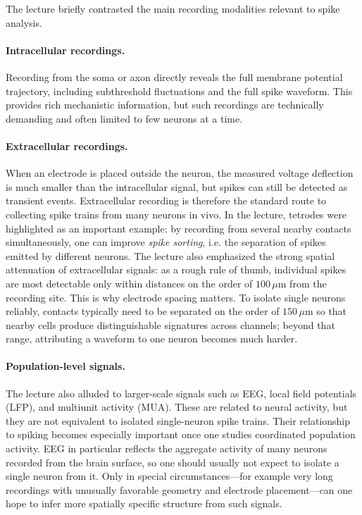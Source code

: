 \documentclass[11pt]{article}
\begin{document}
The lecture briefly contrasted the main recording modalities relevant to spike analysis.

\paragraph{Intracellular recordings.}
Recording from the soma or axon directly reveals the full membrane potential trajectory, including subthreshold fluctuations and the full spike waveform. This provides rich mechanistic information, but such recordings are technically demanding and often limited to few neurons at a time.

\paragraph{Extracellular recordings.}
When an electrode is placed outside the neuron, the measured voltage deflection is much smaller than the intracellular signal, but spikes can still be detected as transient events. Extracellular recording is therefore the standard route to collecting spike trains from many neurons in vivo. In the lecture, tetrodes were highlighted as an important example: by recording from several nearby contacts simultaneously, one can improve \emph{spike sorting}, i.e. the separation of spikes emitted by different neurons. The lecture also emphasized the strong spatial attenuation of extracellular signals: as a rough rule of thumb, individual spikes are most detectable only within distances on the order of $100\,\mu\mathrm{m}$ from the recording site. This is why electrode spacing matters. To isolate single neurons reliably, contacts typically need to be separated on the order of $150\,\mu\mathrm{m}$ so that nearby cells produce distinguishable signatures across channels; beyond that range, attributing a waveform to one neuron becomes much harder.

\paragraph{Population-level signals.}
The lecture also alluded to larger-scale signals such as EEG, local field potentials (LFP), and multiunit activity (MUA). These are related to neural activity, but they are not equivalent to isolated single-neuron spike trains. Their relationship to spiking becomes especially important once one studies coordinated population activity. EEG in particular reflects the aggregate activity of many neurons recorded from the brain surface, so one should usually not expect to isolate a single neuron from it. Only in special circumstances---for example very long recordings with unusually favorable geometry and electrode placement---can one hope to infer more spatially specific structure from such signals.
\end{document}
